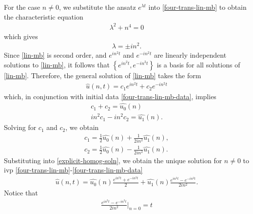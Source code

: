 \documentclass[12pt,reqno]{amsart}
\numberwithin{equation}{section}  %
\newcommand{\wh}{\widehat}
\begin{document}
%
%
For the case $n \neq 0$, we substitute the ansatz $e^{\lambda t}$ into
\eqref{four-trans-lin-mb} to obtain the characteristic equation
%
%
\begin{equation*}
\begin{split}
  \lambda^{2} + n^{4} = 0
\end{split}
\end{equation*}
%
%
which gives 
%
%
\begin{equation*}
\begin{split}
  \lambda = \pm in^{2}.
\end{split}
\end{equation*}
%
Since
\eqref{lin-mb} is second order, and $e^{in^{2}t}$ and $e^{-in^{2}t}$ are
linearly independent solutions to \eqref{lin-mb}, it follows that $\left\{
e^{in^{2}t}, e^{-in^{2}t}
\right\}$ is a basis for all solutions of \eqref{lin-mb}. Therefore, the general
solution of \eqref{lin-mb} takes the form
%
%
\begin{equation}
  \label{explicit-homog-soln}
\begin{split}
  \wh{u}(n,t) = c_{1}e^{in^{2}t} + c_{2}e^{-in^{2}t}
\end{split}
\end{equation}
%
%
which, in conjunction with initial data 
\eqref{four-trans-lin-mb-data}, implies
%
%
\begin{gather*}
   c_{1} + c_{2} = \wh{u_{0}}(n)
  \\
   in^{2}c_{1} - in^{2}c_{2} = \wh{u_{1}}(n).
\end{gather*}
%
%
Solving for $c_{1}$ and $c_{2}$, we obtain
%
%
\begin{gather*}
  c_{1} = \frac{1}{2} \wh{u_{0}}(n) + \frac{1}{2in^{2}}\wh{u_{1}}(n),
  \\
  c_{2} = \frac{1}{2} \wh{u_{0}}(n) - \frac{1}{2in^{2}}\wh{u_{1}}(n).
\end{gather*}
%
%
Substituting into \eqref{explicit-homog-soln}, we obtain the unique solution for
$n \neq 0$ to
ivp \eqref{four-trans-lin-mb}-\eqref{four-trans-lin-mb-data}
%
%
\begin{equation}
  \label{lin-mb-four-soln}
\begin{split}
  \wh{u}(n, t) = \wh{u_{0}}(n) \frac{e^{in^{2}t} + e^{-in^{2}t}}{2} +
  \wh{u_{1}}(n)\frac{e^{in^{2}t} - e^{-in^{2}t}}{2 i n^{2}}.
\end{split}
\end{equation}
%
%
Notice that 
\begin{equation}
  \label{remov-sing}
\begin{split}
  \frac{e^{in^{2}t} - e^{-in^{2}t}}{2 i n^{2}} \Big |_{n =0} = t
\end{split}
\end{equation}
\end{document}
